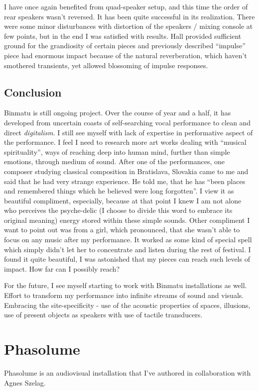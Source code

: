 \documentclass[12pt,a4paper,oneside]{report}
\begin{document}
I have once again benefited from quad-speaker setup, and this time the order of rear speakers wasn't reversed. It has been quite successful in its realization. There were some minor disturbances with distortion of the speakers / mixing console at few points, but in the end I was satisfied with results. Hall provided sufficient ground for the grandiosity of certain pieces and previously described ``impulse'' piece had enormous impact because of the natural reverberation, which haven't smothered transients, yet allowed blossoming of impulse responses.

\subsection{Conclusion} Binmatu is still ongoing project. Over the course of year and a half, it has developed from uncertain coasts of self-searching vocal performance to clean and direct \emph{digitalism}. I still see myself with lack of expertise in performative aspect of the performance. I feel I need to research more art works dealing with ``musical spirituality'', ways of reaching deep into human mind, further than simple emotions, through medium of sound. After one of the performances, one composer studying classical composition in Bratislava, Slovakia came to me and said that he had very strange experience. He told me, that he has ``been places and remembered things which he believed were long forgotten''. I view it as beautiful compliment, especially, because at that point I knew I am not alone who perceives the psyche-delic (I choose to divide this word to embrace its original meaning) energy stored within these simple sounds. Other compliment I want to point out was from a girl, which pronounced, that she wasn't able to focus on any music after my performance. It worked as some kind of special spell which simply didn't let her to concentrate and listen during the rest of festival. I found it quite beautiful, I was astonished that my pieces can reach such levels of impact. How far can I possibly reach?

For the future, I see myself starting to work with Binmatu installations as well. Effort to transform my performance into infinite streams of sound and visuals. Embracing the site-specificity - use of the acoustic properties of spaces, illusions, use of present objects as speakers with use of tactile transducers.

\clearpage
\section{Phasolume} Phasolume is an audiovisual installation that I've authored in collaboration with Agnes Szelag.
\end{document}
